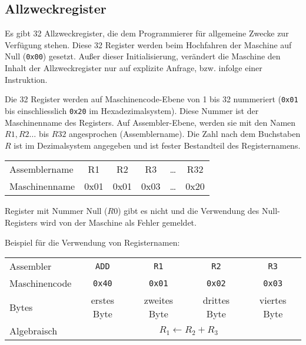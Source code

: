 \subsection{Allzweckregister}
Es gibt 32 Allzweckregister, die dem Programmierer für allgemeine Zwecke zur
Verfügung stehen.
Diese 32 Register werden beim Hochfahren der Maschine auf Null (\texttt{0x00})
gesetzt. Außer dieser Initialisierung, verändert die Maschine den Inhalt der
Allzweckregister nur auf explizite Anfrage, bzw. infolge einer Instruktion. 

Die 32 Register werden auf Maschinencode-Ebene von 1 bis 32 nummeriert
(\texttt{0x01} bis einschliesslich \texttt{0x20} im Hexadezimalsystem).
Diese Nummer ist der Maschinenname des Registers.
Auf Assembler-Ebene, werden sie mit den Namen $R1, R2\dots$ bis $R32$
angesprochen (Assemblername).
Die Zahl nach dem Buchstaben $R$ ist im Dezimalsystem angegeben
und ist fester Bestandteil des Registernamens.

\begin{center}
  \begin{tabular}{l||*{5}{T|}}
    Assemblername & R1   & R2   & R3   & \dots & R32 \\
    Maschinenname & 0x01 & 0x01 & 0x03 & \dots & 0x20
  \end{tabular}
\end{center}

Register mit Nummer Null ($R0$) gibt es nicht und die Verwendung des
Null-Registers wird von der Maschine als Fehler gemeldet.

Beispiel für die Verwendung von Registernamen:
\begin{center}
  \begin{tabular}{|l||*{4}{c|}}                                       \hline
    Assembler     & \texttt{ADD}  & \texttt{R1}   & \texttt{R2}   &
                    \texttt{R3}                                      \\
    Maschinencode & \texttt{0x40} & \texttt{0x01} & \texttt{0x02} &
                    \texttt{0x03}                                    \\\hline
    Bytes         & erstes Byte   & zweites Byte  & drittes Byte  & 
                    viertes Byte                                     \\\hline
    Algebraisch   & \multicolumn{4}{c|}{$R_{1} \gets R_{2} + R_{3}$} \\\hline
  \end{tabular}
\end{center}


